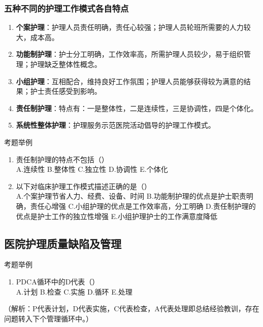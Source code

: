 \documentclass[11pt, a4paper]{ctexart}
\begin{document}
\subsubsection{五种不同的护理工作模式各自特点}
\begin{enumerate}
	\item \textbf{个案护理}：护理人员责任明确，责任心较强；护理人员轮班所需要的人力较大，成本高。
	\item \textbf{功能制护理}：护士分工明确，工作效率高，所需护理人员较少，易于组织管理；护理缺乏整体性概念。
	\item \textbf{小组护理}：互相配合，维持良好工作氛围；护理人员能够获得较为满意的结果；护士责任感受到影响。
	\item \textbf{责任制护理}：特点有：一是整体性，二是连续性，三是协调性，四是个体化。
	\item \textbf{系统性整体护理}：护理服务示范医院活动倡导的护理工作模式。
\end{enumerate}

\begin{examplebox}{考题举例}
	\begin{enumerate}
		\item 责任制护理的特点不包括（\qquad）\\
		      A.连续性 \quad B.整体性 \quad C.独立性 \quad D.协调性 \quad E.个体化
		\item 以下对临床护理工作模式描述正确的是（\qquad）\\
		      A.个案护理节省人力、经费、设备、时间 \quad B.功能制护理的优点是护士职责明确，责任心增强 \quad C.小组护理的优点是工作效率高，分工明确 \quad D.责任制护理的优点是护士工作的独立性增强 \quad E.小组护理护士的工作满意度降低
	\end{enumerate}
\end{examplebox}

\subsection{医院护理质量缺陷及管理}
\begin{examplebox}{考题举例}
	\begin{enumerate}
		\item PDCA循环中的D代表（\qquad）\\
		      A.计划 \quad B.检查 \quad C.实施 \quad D.循环 \quad E.处理
	\end{enumerate}
	（解析：P代表计划，D代表实施，C代表检查，A代表处理即总结经验教训，存在问题转入下个管理循环中。）
\end{examplebox}
\end{document}
